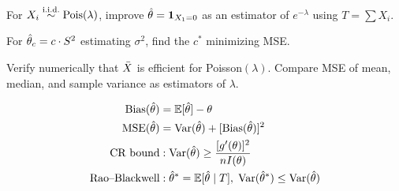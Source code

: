 \begin{exercise}
For $X_i\overset{\text{i.i.d.}}{\sim}\mathrm{Pois}(\lambda)$, improve $\hat{\theta}=\mathbf{1}_{X_1=0}$ as an estimator of $e^{-\lambda}$ using $T=\sum X_i$.
\end{exercise}

\begin{exercise}
For $\hat{\theta}_c=c\cdot S^2$ estimating $\sigma^2$, find the $c^*$ minimizing MSE.
\end{exercise}

\begin{exercise}
Verify numerically that $\bar{X}$ is efficient for Poisson$(\lambda)$. Compare MSE of mean, median, and sample variance as estimators of $\lambda$.
\end{exercise}

\begin{keyformulas}
\begin{align*}
\operatorname{Bias}(\hat{\theta}) &= \mathbb{E}[\hat{\theta}]-\theta \\
\operatorname{MSE}(\hat{\theta}) &= \operatorname{Var}(\hat{\theta})+[\operatorname{Bias}(\hat{\theta})]^2 \\
\text{CR bound} &: \operatorname{Var}(\hat{\theta})\geq \frac{[g'(\theta)]^2}{nI(\theta)} \\
\text{Rao--Blackwell} &: \hat{\theta}^*=\mathbb{E}[\hat{\theta}\mid T],\;\operatorname{Var}(\hat{\theta}^*)\leq\operatorname{Var}(\hat{\theta})
\end{align*}
\end{keyformulas}
